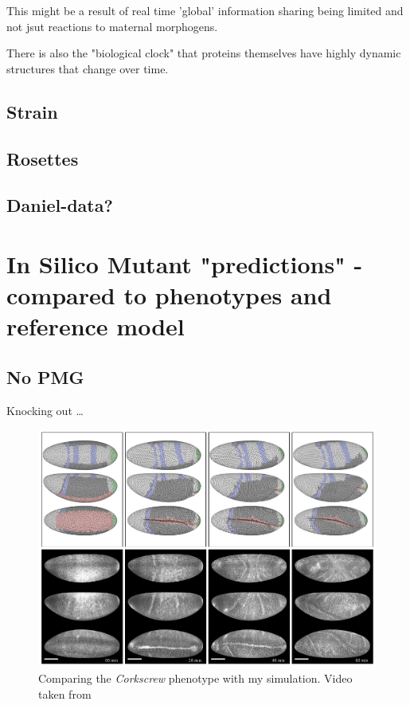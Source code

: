 This might be a result of real time 'global' information sharing being limited and not jsut reactions to maternal morphogens.

There is also the "biological clock"\cite{johanolsen2} that proteins themselves have highly dynamic structures that change over time.\cite{johanolsen1}
\subsection{Strain}
\subsection{Rosettes}
\subsection{Daniel-data?}
\newpage
\section{In Silico Mutant "predictions" - compared to phenotypes and reference model}
\subsection{No PMG}

Knocking out \dots

\begin{figure}[H]
    \centering
    \includegraphics[width=1\linewidth]{chapters/Results/figures/corkscrew_comparison.png}
    \caption{Comparing the \textit{Corkscrew} phenotype with my simulation. Video taken from \cite{smits2023maintaining}}
    \label{fig:corkscrew-comparison}
\end{figure}
